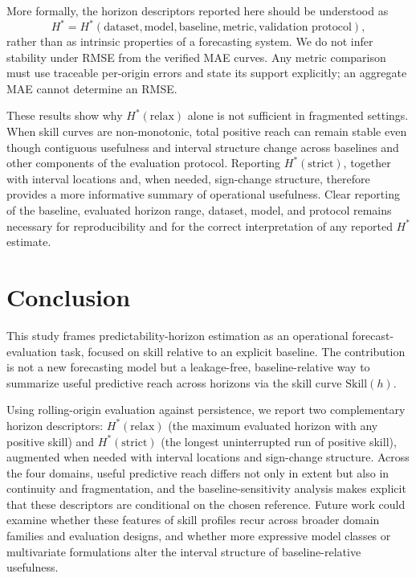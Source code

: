 \documentclass[pdflatex]{sn-jnl}
\begin{document}
More formally, the horizon descriptors reported here should be understood as
\[
H^* = H^*(\text{dataset}, \text{model}, \text{baseline}, \text{metric}, \text{validation protocol}),
\]
rather than as intrinsic properties of a forecasting system. We do not
infer stability under RMSE from the verified MAE curves. Any metric
comparison must use traceable per-origin errors and state its support
explicitly; an aggregate MAE cannot determine an RMSE.

These results show why $H^*(\mathrm{relax})$ alone is not sufficient in
fragmented settings. When skill curves are non-monotonic, total positive
reach can remain stable even though contiguous usefulness and interval
structure change across baselines and other components of the evaluation protocol. Reporting $H^*(\mathrm{strict})$,
together with interval locations and, when needed, sign-change
structure, therefore provides a more informative summary of operational
usefulness. Clear reporting of the baseline, evaluated horizon range,
dataset, model, and protocol remains necessary for reproducibility and
for the correct interpretation of any reported $H^*$ estimate.


\section{Conclusion}

This study frames predictability-horizon estimation as an operational
forecast-evaluation task, focused on skill relative to an explicit
baseline. The contribution is not a new forecasting model but a
leakage-free, baseline-relative way to summarize useful predictive reach
across horizons via the skill curve $\mathrm{Skill}(h)$.

Using rolling-origin evaluation against persistence, we report two
complementary horizon descriptors: $H^*(\mathrm{relax})$ (the maximum
evaluated horizon with any positive skill) and $H^*(\mathrm{strict})$
(the longest uninterrupted run of positive skill), augmented when needed
with interval locations and sign-change structure. Across the four
domains, useful predictive reach differs not only in extent but also in
continuity and fragmentation, and the baseline-sensitivity analysis makes
explicit that these descriptors are conditional on the chosen reference.
Future work could examine whether these
features of skill profiles recur across broader
domain families and evaluation designs, and whether more expressive model
classes or multivariate formulations alter the interval structure of
baseline-relative usefulness.
\end{document}
